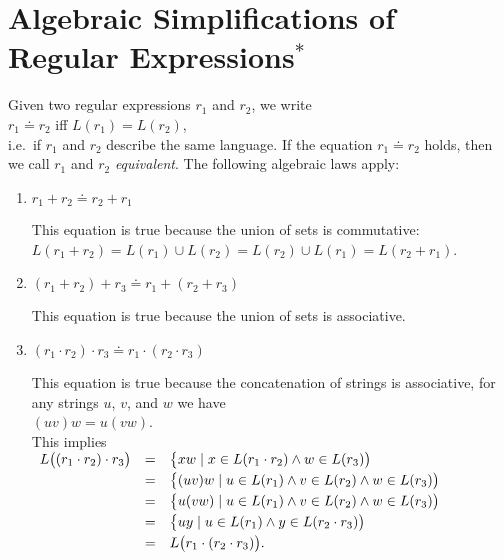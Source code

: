 \section{Algebraic Simplifications of Regular Expressions$^*$}
Given two regular expressions $r_1$ and $r_2$, we write
\\[0.2cm]
\hspace*{1.3cm}
$r_1 \doteq r_2$ \quad iff \quad $L(r_1) = L(r_2)$,
\\[0.2cm]
i.e.~if $r_1$ and $r_2$ describe the same language.  If the equation $r_1 \doteq r_2$ holds, then we
call $r_1$ and $r_2$ \emph{equivalent}.  The following algebraic laws apply:
\begin{enumerate}
\item $r_1 + r_2 \doteq r_2 + r_1$

      This equation is true because the union of sets is commutative:
      \\[0.2cm]
      \hspace*{1.3cm}
      $L(r_1 + r_2) = L(r_1) \cup L(r_2) = L(r_2) \cup L(r_1) = L(r_2 + r_1)$.
\item $(r_1 + r_2) + r_3 \doteq r_1 + (r_2 + r_3)$

      This equation is true because the union of sets is associative.
\item $(r_1 \cdot r_2) \cdot r_3 \doteq r_1 \cdot (r_2 \cdot r_3)$

      This equation is true because the concatenation of strings is associative, for any strings
      $u$, $v$, and $w$ we have
      \\[0.2cm]
      \hspace*{1.3cm}
      $(u v) w = u (v w)$.
      \\[0.2cm]
      This implies
      \\[0.2cm]
      \hspace*{1.3cm}
      $
      \begin{array}[t]{lcl}
        L\bigl( (r_1 \cdot r_2) \cdot r_3\bigr) 
        & = & \bigl\{ x w \mid x \in L(r_1 \cdot r_2) \wedge w \in L(r_3)\bigr) \\[0.1cm]
        & = & \bigl\{ (u v) w \mid u \in L(r_1) \wedge v \in L(r_2) \wedge w \in L(r_3)\bigr) \\[0.1cm]
        & = & \bigl\{ u (v w) \mid u \in L(r_1) \wedge v \in L(r_2) \wedge w \in L(r_3)\bigr) \\[0.1cm]
        & = & \bigl\{ u y \mid u \in L(r_1) \wedge y \in L(r_2 \cdot r_3)\bigr) \\[0.1cm]
        & = & L\bigl( r_1 \cdot (r_2 \cdot r_3)\bigr).
      \end{array}
      $


\end{enumerate}
